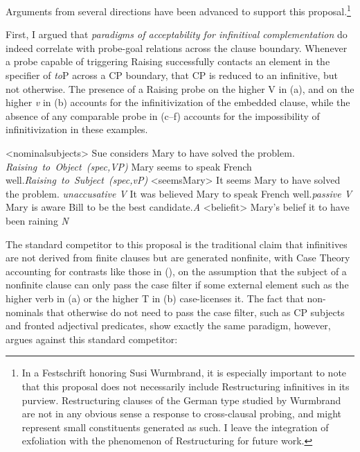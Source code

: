 \documentclass[output=paper]{langscibook}
\begin{document}
Arguments from several directions have been advanced to support this proposal.\footnote{In a Festschrift honoring Susi Wurmbrand, it is especially important to note that this proposal does not necessarily include Restructuring infinitives in its purview. Restructuring clauses of the German type studied by Wurmbrand are not in any obvious sense a response to cross-clausal probing, and might represent small constituents generated as such. I leave the integration of exfoliation with the phenomenon of Restructuring for future work.} 

{\def\lingexbreakpenalty{10}
First, I argued that \textit{paradigms of acceptability for infinitival complementation} do indeed correlate with probe-goal relations across the clause boundary. Whenever a probe capable of triggering Raising successfully contacts an element in the specifier of \textit{to}P across a CP boundary, that CP is reduced to an infinitive, but not otherwise. The presence of a Raising probe on the higher V in (a), and on the higher \textit{v} in (b) accounts for the infinitivization of the embedded clause, while the absence of any comparable probe in (c--f) accounts for the impossibility of infinitivization in these examples.

\pex<nominalsubjects> 
\a Sue considers Mary to have solved the problem. \\\hbox{}\hfill\hbox{\emph{Raising to Object (spec,VP)}}
\a Mary seems to speak French well.\hbox{}\hfill\hbox{\emph{Raising to Subject (spec,\textit{v}P)}}
\a<seemsMary> \ljudge*It seems Mary to have solved the problem. \hfill\emph{unaccusative V}
\a \ljudge*It was believed Mary to speak French well.\hfill\emph{passive V}
\a \ljudge*Mary is aware Bill to be the best candidate.\hfill\emph{A}
\a<beliefit> \ljudge*Mary's belief it to have been raining \hfill\emph{N}
\xe

\noindent The standard competitor to this proposal is the traditional claim that infinitives are not derived from finite clauses but are generated nonfinite, with Case Theory accounting for contrasts like those in (), on the assumption that the subject of a nonfinite clause can only pass the case filter if some external element such as the higher verb in (a) or the higher T in (b) case-licenses it. The fact that non-nominals that otherwise do not need to pass the case filter, such as CP subjects and fronted adjectival predicates, show exactly the same paradigm, however, argues against this standard competitor:\largerpage

}
\end{document}
